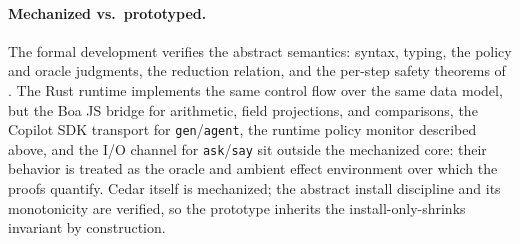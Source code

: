\paragraph{Mechanized vs.\ prototyped.} The formal development verifies the
abstract semantics: syntax, typing, the policy and oracle judgments, the
reduction relation, and the per-step safety theorems of .
The Rust runtime implements the same control flow over the same data model, but
the Boa JS bridge for arithmetic, field projections, and comparisons, the Copilot
SDK transport for \texttt{gen}/\texttt{agent}, the runtime policy monitor
described above, and the I/O channel for \texttt{ask}/\texttt{say} sit outside
the mechanized core: their behavior is treated as the oracle and ambient effect
environment over which the proofs quantify. Cedar itself is mechanized; the
abstract install discipline and its monotonicity are verified, so the
prototype inherits the install-only-shrinks invariant by construction.
